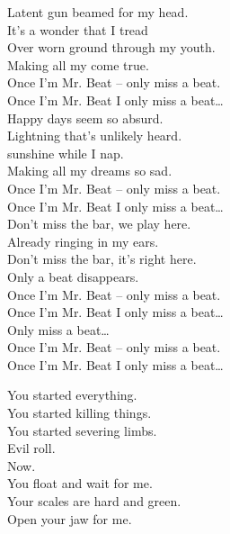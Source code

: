 Latent gun beamed for my head. \\
It's a wonder that I tread \\
Over worn ground through my youth. \\
Making all my  come true. \\

Once I'm Mr. Beat -- only miss a beat. \\
Once I'm Mr. Beat I only miss a beat… \\

Happy days seem so absurd. \\
Lightning that's unlikely heard. \\
 sunshine while I nap. \\
Making all my dreams so sad. \\

Once I'm Mr. Beat -- only miss a beat. \\
Once I'm Mr. Beat I only miss a beat… \\

Don't miss the bar, we play here. \\
Already ringing in my ears. \\
Don't miss the bar, it's right here. \\
Only a beat disappears. \\

Once I'm Mr. Beat -- only miss a beat. \\
Once I'm Mr. Beat I only miss a beat… \\

Only miss a beat… \\

Once I'm Mr. Beat -- only miss a beat. \\
Once I'm Mr. Beat I only miss a beat… \\




You started everything. \\
You started killing things. \\
You started severing limbs. \\

Evil  roll. \\
Now. \\

You float and wait for me. \\
Your scales are hard and green. \\
Open your jaw for me. \\


